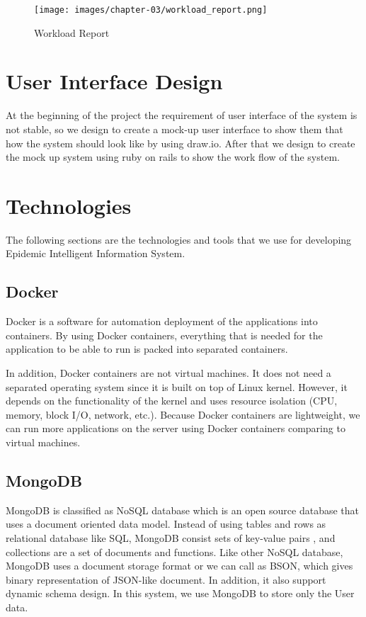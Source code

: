  	\FloatBarrier
     	\begin{figure}[h!]
            \centering
         		\texttt{[image: images/chapter-03/workload\_report.png]}
         		\caption{Workload Report}
        		\label{workload-report}
        \end{figure}
 	\FloatBarrier

\vspace{10mm}
\section{User Interface Design}
    At the beginning of the project the requirement of user interface of the system is not stable, so we design to create a mock-up user interface to show them that how the system should look like by using draw.io. After that we design to create the mock up system using ruby on rails to show the work flow of the system.
    

	

\section{Technologies}
    The following sections are the technologies and tools that we use for developing Epidemic Intelligent Information System.
    
    \subsection{Docker}
        Docker\cite{docker} is a software for automation deployment of the applications into containers. By using Docker containers, everything that is needed for the application to be able to run is packed into separated containers.
        
        In addition, Docker containers are not virtual machines. It does not need a separated operating system since it is built on top of Linux kernel. However, it depends on the functionality of the kernel and uses resource isolation (CPU, memory, block I/O, network, etc.). Because Docker containers are lightweight, we can run more applications on the server using Docker containers comparing to virtual machines.
        
    \subsection{MongoDB}
        MongoDB\cite{mongodb} is classified as NoSQL database which is an open source database that uses a document oriented data model. Instead of using tables and rows as relational database like SQL, MongoDB consist sets of key-value pairs , and collections are a set of documents and functions.  Like other NoSQL database, MongoDB uses a document storage format or we can call as BSON, which gives binary representation of JSON-like document. In addition, it also support dynamic schema design. In this system, we use MongoDB to store only the User data.
                
